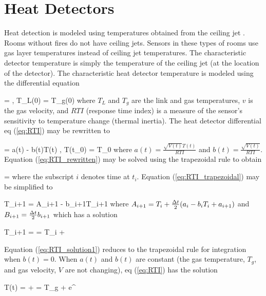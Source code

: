\section{Heat Detectors}

Heat detection is modeled using temperatures obtained from the ceiling jet \cite{Cooper:1991}. Rooms without fires do not have ceiling jets. Sensors in these types of rooms use gas layer temperatures instead of ceiling jet temperatures. The characteristic detector temperature is simply the temperature of the ceiling jet (at the location of the detector). The characteristic heat detector temperature is modeled using the differential equation \cite{Heskestad:1976}

\be {} =   \; , \; T_L(0) = T_g(0)\label{eq:RTI} \ee
where $T_L$ and $T_g$ are the link and gas temperatures, $v$ is the gas velocity, and $RTI$ (response time index) is a measure of the sensor's sensitivity to temperature change (thermal inertia).  The heat detector differential eq (\ref{eq:RTI}) may be rewritten to

\be {} = a(t) - b(t)T(t) \; , \; T(t_0) = T_0 \label{eq:RTI_rewritten} \ee
where $a(t) = \frac{\sqrt{V(t)}T(t)}{RTI}$ and $b(t) = \frac{\sqrt{V(t)}}{RTI}$. Equation (\ref{eq:RTI_rewritten}) may be solved using the trapezoidal rule to obtain

\be {} =   \label{eq:RTI_trapezoidal} \ee
where the subscript $i$ denotes time at $t_i$. Equation (\ref{eq:RTI_trapezoidal}) may be simplified to

\be T_{i+1} = A_{i+1} - b_{i+1}T_{i+1} \label{eq:RTI_trapezoidal_simplified} \ee
where $A_{i+1} = T_i + {\frac{\Delta t}{2}} { \left( {a_i - b_iT_i + a_{i+1}} \right) }$ and $B_{i+1} = {\frac{\Delta t}{2}} b_{i+1}$ which has a solution

\be T_{i+1} =  =  T_i  +  \label{eq:RTI_solution1} \ee

Equation (\ref{eq:RTI_solution1}) reduces to the trapezoidal rule for integration when $b(t) = 0$. When $a(t)$ and $b(t)$ are constant (the gas temperature, $T_g$, and gas velocity, $V$ are not changing), eq (\ref{eq:RTI}) has the solution

\be T(t) =  +  = T_g + e^{}
 \ee

